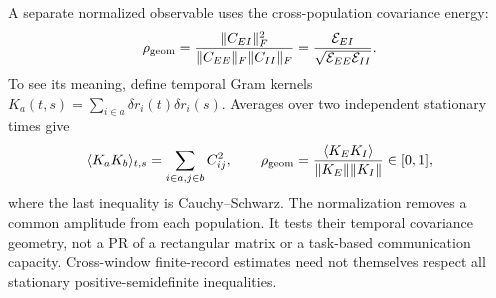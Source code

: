A separate normalized observable uses the cross-population covariance energy:
\begin{equation}
 \rho_{\rm geom}=
 \frac{\|C_{EI}\|_F^2}{\|C_{EE}\|_F\|C_{II}\|_F}
 =\frac{\mathcal E_{EI}}
        {\sqrt{\mathcal E_{EE}\mathcal E_{II}}}.
\end{equation}
To see its meaning, define temporal Gram kernels
$K_a(t,s)=\sum_{i\in a}\delta r_i(t)\delta r_i(s)$.
Averages over two independent stationary times give
\begin{equation}
 \langle K_aK_b\rangle_{t,s}=\sum_{i\in a,j\in b}C_{ij}^2,
 \qquad
 \rho_{\rm geom}=\frac{\langle K_EK_I\rangle}
                        {\|K_E\|\|K_I\|}\in[0,1],
\end{equation}
where the last inequality is Cauchy--Schwarz. The normalization removes a
common amplitude from each population. It tests their temporal covariance
geometry, not a PR of a rectangular matrix or a task-based communication
capacity. Cross-window finite-record estimates need not themselves respect
all stationary positive-semidefinite inequalities.
